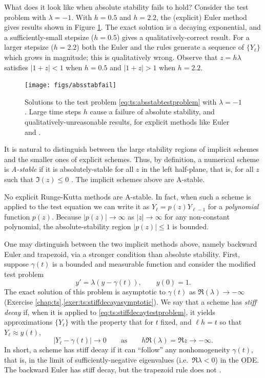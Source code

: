 What does it look like when absolute stability fails to hold?  Consider the test problem with $\lambda=-1$.  With $h=0.5$ and $h=2.2$, the (explicit) Euler method gives results shown in Figure \ref{fig:ts:absstabfail}.  The exact solution is a decaying exponential, and a sufficiently-small stepsize ($h=0.5$) gives a qualitatively-correct result.  For a larger stepsize ($h=2.2$) both the Euler and the \RKtwoa rules generate a sequence of $\{Y_\ell\}$ which grows in magnitude; this is qualitatively wrong.  Observe that $z=h\lambda$ satisfies $|1+z|<1$ when $h=0.5$ and $|1+z|>1$ when $h=2.2$.

\begin{figure}
\texttt{[image: figs/absstabfail]}
\caption{Solutions to the test problem \eqref{eq:ts:absstabtestproblem} with $\lambda=-1$.  Large time steps $h$ cause a failure of absolute stability, and qualitatively-unreasonable results, for explicit methods like Euler and \RKtwoa.}
\label{fig:ts:absstabfail}
\end{figure}

It is natural to distinguish between the large stability regions of implicit schemes and the smaller ones of explicit schemes.  Thus, by definition, a numerical scheme is \emph{A-stable} if it is absolutely-stable for all $z$ in the left half-plane, that is, for all $z$ such that $\Im(z)\le 0$ \citep{AscherPetzold1998}.  The implicit schemes above are A-stable.

No explicit Runge-Kutta methods are A-stable.  In fact, when such a scheme is applied to the test equation we can write it as $Y_\ell = p(z) Y_{\ell-1}$ for a \emph{polynomial} function $p(z)$.  Because $|p(z)|\to\infty$ as $|z|\to \infty$ for any non-constant polynomial, the absolute-stability region $|p(z)|\le 1$ is bounded.

One may distinguish between the two implicit methods above, namely backward Euler and trapezoid, via a stronger condition than absolute stability.  First, suppose $\gamma(t)$ is a bounded and measurable function and consider the modified test problem
\begin{equation}
y' = \lambda \left(y - \gamma(t)\right), \qquad y(0)=1. \label{eq:ts:stiffdecaytestproblem}
\end{equation}
The exact solution of this problem is asymptotic to $\gamma(t)$ as $\Re(\lambda) \to -\infty$ (Exercise \ref{chap:ts}.\ref{exer:ts:stiffdecayasymptotic}).  We say that a scheme has \emph{stiff decay} if, when it is applied to \eqref{eq:ts:stiffdecaytestproblem}, it yields approximations $\{Y_\ell\}$ with the property that for $t$ fixed, and $\ell h = t$ so that $Y_\ell \approx y(t)$,
\begin{equation}
|Y_\ell - \gamma(t)| \to 0 \qquad \text{as} \qquad h \Re(\lambda) = \Re z \to -\infty. \label{eq:ts:stiffdecaydefn}
\end{equation}
In short, a scheme has stiff decay if it can ``follow'' any nonhomogeneity $\gamma(t)$, that is, in the limit of sufficiently-negative eigenvalues (i.e.~$\Re \lambda < 0$) in the ODE.  The backward Euler has stiff decay, but the trapezoid rule does not \citep{AscherPetzold1998}.

